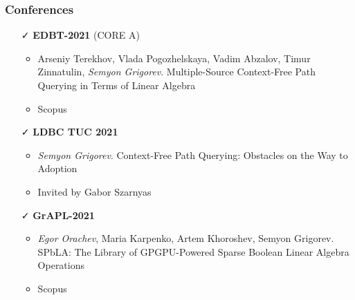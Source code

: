 \documentclass[xcolor=table]{beamer}
\begin{document}
\begin{frame}[fragile]
\frametitle{Conferences}
\begin{itemize}

      \item[\faCheck] \textbf{EDBT-2021} (CORE A) 
      \begin{itemize}
        \item Arseniy Terekhov, Vlada Pogozhelskaya, Vadim Abzalov, Timur Zinnatulin, \emph{Semyon Grigorev}. Multiple-Source Context-Free Path Querying in Terms of Linear Algebra
        \item Scopus
      \end{itemize}
        
      \item[\faCheck] \textbf{LDBC TUC 2021}
      \begin{itemize}
         \item \emph{Semyon Grigorev}. Context-Free Path Querying: Obstacles on the Way to Adoption
         \item Invited by Gabor Szarnyas
      \end{itemize}

      \item[\faCheck] \textbf{GrAPL-2021}
      \begin{itemize}
         \item \emph{Egor Orachev}, Maria Karpenko, Artem Khoroshev, Semyon Grigorev. SPbLA: The Library of GPGPU-Powered Sparse Boolean Linear Algebra Operations
         \item Scopus
      \end{itemize}

    \end{itemize}
    \end{frame}
\end{document}
